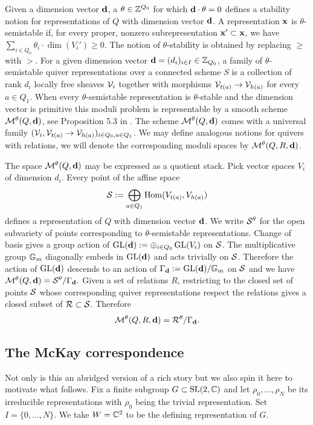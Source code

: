\documentclass{amsart}
\theoremstyle{definition}
\begin{document}
Given a dimension vector $\mathbf{d}$, a $\theta \in \mathbb{Z}^{Q_0}$ for which $\mathbf{d} \cdot \theta=0$ defines a stability notion for representations of $Q$ with dimension vector $\mathbf{d}$.
A representation $\mathbf{x}$ is $\theta$-semistable if, for every proper, nonzero subrepresentation $\mathbf{x}' \subset \mathbf{x}$, we have $\sum_{i \in Q_0} \theta_i \cdot \dim(V_i') \geq 0$.  
The notion of $\theta$-stability is obtained by replacing $\geq$ with $>$. 
For a given dimension vector $\mathbf{d} =(d_i)_{i \in I} \in \mathbb{Z}_{Q_0}$, a family of $\theta$-semistable quiver representations over a connected scheme $S$ is a collection of rank $d_i$ locally free sheaves $\mathcal{V}_i$ together with morphisms $\mathcal{V}_{t(a)} \rightarrow \mathcal{V}_{h(a)}$ for every $a\in Q_1$. 
When every $\theta$-semistable representation is $\theta$-stable and the dimension vector is primitive this moduli problem is representable by a smooth scheme $\mathcal{M}^\theta(Q, \mathbf{d})$, see Proposition 5.3 in \cite{King}.
The scheme $\mathcal{M}^\theta(Q, \mathbf{d})$ comes with a universal family $(\mathcal{V}_i, \mathcal{V}_{t(a)} \rightarrow \mathcal{V}_{h(a)})_{i \in Q_0, a \in Q_1}$. 
We may define analogous notions for quivers with relations, we will denote the corresponding moduli spaces by $\mathcal{M}^\theta(Q,R,\mathbf{d})$.

The space $\mathcal{M}^\theta(Q, \mathbf{d})$ may be expressed as a quotient stack.
Pick vector spaces $V_i$ of dimension $d_i$.
Every point of the affine space
$$\mathcal{S}:= \bigoplus_{a \in Q_1} \operatorname{Hom}(V_{t(a)}, V_{h(a)})$$
defines a representation of $Q$ with dimension vector $\mathbf{d}$.
We write $\mathcal{S}^\theta$ for the open subvariety of points corresponding to $\theta$-semistable representations.
Change of basis gives a group action of $\operatorname{GL}(\mathbf{d}):= \oplus_{i \in Q_0} \operatorname{GL}(V_i)$ on $\mathcal{S}$.
The multiplicative group $\mathbb{G}_m$ diagonally embeds in $\operatorname{GL}(\mathbf{d})$ and acts trivially on $\mathcal{S}$.
Therefore the action of $\operatorname{GL}(\mathbf{d})$ descends to an action of $\Gamma_{\mathbf{d}}:= \operatorname{GL}(\mathbf{d})/\mathbb{G}_m$ on $\mathcal{S}$ and we have $\mathcal{M}^\theta(Q, \mathbf{d}) = \mathcal{S}^\theta / \Gamma_{\mathbf{d}}.$
Given a set of relations $R$, restricting to the closed set of points $\mathcal{S}$ whose corresponding quiver representations respect the relations gives a closed subset of $\mathcal{R} \subset \mathcal{S}$.
Therefore $$\mathcal{M}^\theta(Q,R,\mathbf{d})= \mathcal{R}^\theta/\Gamma_{\mathbf{d}}.$$

\subsection{The McKay correspondence}\label{ssc:McKay}
Not only is this an abridged version of a rich story but we also spin it here to motivate what follows.
Fix a finite subgroup $G \subset \operatorname{SL}(2,\mathbb{C})$ and let $\rho_0, \ldots, \rho_N$ be its
irreducible representations with $\rho_0$ being the trivial representation.
Set $I=\{0,\ldots,N\}$.
We take $W=\mathbb{C}^2$ to be the defining representation of $G$.
\end{document}
